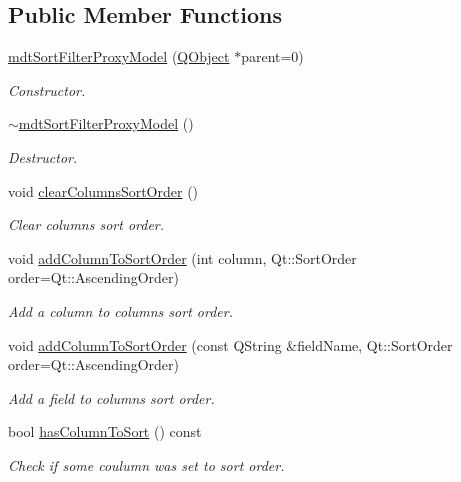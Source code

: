 \subsection*{Public Member Functions}
\begin{DoxyCompactItemize}
\item 
\hyperlink{classmdt_sort_filter_proxy_model_a83bcd157f655c4d675e5a30d97fa16ba}{mdt\-Sort\-Filter\-Proxy\-Model} (\hyperlink{class_q_object}{Q\-Object} $\ast$parent=0)
\begin{DoxyCompactList}\small\item\em Constructor. \end{DoxyCompactList}\item 
\hyperlink{classmdt_sort_filter_proxy_model_a5d1c4647657a13d4b225e790a6b8d1a3}{$\sim$mdt\-Sort\-Filter\-Proxy\-Model} ()
\begin{DoxyCompactList}\small\item\em Destructor. \end{DoxyCompactList}\item 
void \hyperlink{classmdt_sort_filter_proxy_model_aad45b85d23fe3c2eb6198a9eece685d2}{clear\-Columns\-Sort\-Order} ()
\begin{DoxyCompactList}\small\item\em Clear columns sort order. \end{DoxyCompactList}\item 
void \hyperlink{classmdt_sort_filter_proxy_model_a22d0f84ebcc9af078f3c004dbe790fe8}{add\-Column\-To\-Sort\-Order} (int column, Qt\-::\-Sort\-Order order=Qt\-::\-Ascending\-Order)
\begin{DoxyCompactList}\small\item\em Add a column to columns sort order. \end{DoxyCompactList}\item 
void \hyperlink{classmdt_sort_filter_proxy_model_ae447c8f1449b1314fac2448c8b004885}{add\-Column\-To\-Sort\-Order} (const Q\-String \&field\-Name, Qt\-::\-Sort\-Order order=Qt\-::\-Ascending\-Order)
\begin{DoxyCompactList}\small\item\em Add a field to columns sort order. \end{DoxyCompactList}\item 
bool \hyperlink{classmdt_sort_filter_proxy_model_a2dcbaa1d5ffb38368a87e6b4834053f1}{has\-Column\-To\-Sort} () const 
\begin{DoxyCompactList}\small\item\em Check if some coulumn was set to sort order. \end{DoxyCompactList}\item 

\end{DoxyCompactItemize}
